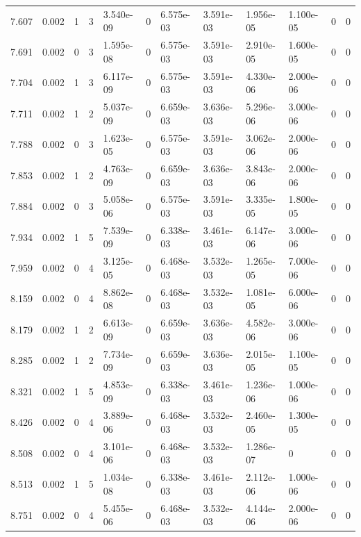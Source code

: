 \documentclass[preview]{standalone}
\begin{document}
{{{\begin{tabular}{L{1.2cm}C{1.2cm} C{0.3cm}C{0.5cm} C{1.4cm}C{1.4cm} C{1.4cm}C{1.4cm} C{1.6cm}C{1.6cm} C{1.6cm}C{1.6cm}}
  7.607  &  0.002  & 1     &  3 &  3.540e-09  & 0  &  6.575e-03&   3.591e-03& 1.956e-05 & 1.100e-05   &  0 & 0  \\ 
  7.691  &  0.002  & 0     &  3 &  1.595e-08  & 0  &  6.575e-03&   3.591e-03& 2.910e-05 & 1.600e-05   &  0 & 0  \\ 
  7.704  &  0.002  & 1     &  3 &  6.117e-09  & 0  &  6.575e-03&   3.591e-03& 4.330e-06 & 2.000e-06   &  0 & 0  \\ 
  7.711  &  0.002  & 1     &  2 &  5.037e-09  & 0  &  6.659e-03&   3.636e-03& 5.296e-06 & 3.000e-06   &  0 & 0  \\ 
  7.788  &  0.002  & 0     &  3 &  1.623e-05  & 0  &  6.575e-03&   3.591e-03& 3.062e-06 & 2.000e-06   &  0 & 0  \\ 
  7.853  &  0.002  & 1     &  2 &  4.763e-09  & 0  &  6.659e-03&   3.636e-03& 3.843e-06 & 2.000e-06   &  0 & 0  \\ 
  7.884  &  0.002  & 0     &  3 &  5.058e-06  & 0  &  6.575e-03&   3.591e-03& 3.335e-05 & 1.800e-05   &  0 & 0  \\ 
  7.934  &  0.002  & 1     &  5 &  7.539e-09  & 0  &  6.338e-03&   3.461e-03& 6.147e-06 & 3.000e-06   &  0 & 0  \\ 
  7.959  &  0.002  & 0     &  4 &  3.125e-05  & 0  &  6.468e-03&   3.532e-03& 1.265e-05 & 7.000e-06   &  0 & 0  \\ 
  8.159  &  0.002  & 0     &  4 &  8.862e-08  & 0  &  6.468e-03&   3.532e-03& 1.081e-05 & 6.000e-06   &  0 & 0  \\ 
  8.179  &  0.002  & 1     &  2 &  6.613e-09  & 0  &  6.659e-03&   3.636e-03& 4.582e-06 & 3.000e-06   &  0 & 0  \\ 
  8.285  &  0.002  & 1     &  2 &  7.734e-09  & 0  &  6.659e-03&   3.636e-03& 2.015e-05 & 1.100e-05   &  0 & 0  \\ 
  8.321  &  0.002  & 1     &  5 &  4.853e-09  & 0  &  6.338e-03&   3.461e-03& 1.236e-06 & 1.000e-06   &  0 & 0  \\ 
  8.426  &  0.002  & 0     &  4 &  3.889e-06  & 0  &  6.468e-03&   3.532e-03& 2.460e-05 & 1.300e-05   &  0 & 0  \\ 
  8.508  &  0.002  & 0     &  4 &  3.101e-06  & 0  &  6.468e-03&   3.532e-03& 1.286e-07 & 0   &  0 & 0  \\ 
  8.513  &  0.002  & 1     &  5 &  1.034e-08  & 0  &  6.338e-03&   3.461e-03& 2.112e-06 & 1.000e-06   &  0 & 0  \\ 
  8.751  &  0.002  & 0     &  4 &  5.455e-06  & 0  &  6.468e-03&   3.532e-03& 4.144e-06 & 2.000e-06   &  0 & 0  \\ 

\end{tabular}}}}
\end{document}

